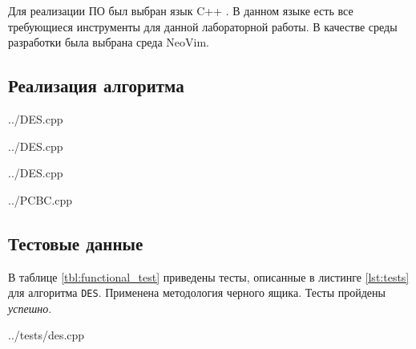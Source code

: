 Для реализации ПО был выбран язык C++ \cite{c++}.
В данном языке есть все требующиеся инструменты для данной лабораторной работы.
В качестве среды разработки была выбрана среда NeoVim\cite{nvim}.

\subsection{Реализация алгоритма}

\begin{lstinputlisting}[
        caption={\raggedright Реализация алгоритма DES.},
        label={lst:des},
        language={C++},
        linerange={3-32}
    ]{../DES.cpp}
\end{lstinputlisting}

\begin{lstinputlisting}[
        caption={\raggedright Реализация алгоритма DES, часть 2.},
        label={lst:des},
        language={C++},
        linerange={33-69}
    ]{../DES.cpp}
\end{lstinputlisting}

\begin{lstinputlisting}[
        caption={\raggedright Реализация алгоритма DES, часть 3.},
        label={lst:des-2},
        language={C++},
        linerange={70-81}
    ]{../DES.cpp}
\end{lstinputlisting}

\begin{lstinputlisting}[
        caption={\raggedright Реализация алгоритма шифрования PCBC.},
        label={lst:pcbc},
        language={C++},
        linerange={25-38,40-50}
    ]{../PCBC.cpp}
\end{lstinputlisting}

\subsection{Тестовые данные}

В таблице \ref{tbl:functional_test} приведены тесты, описанные в листинге \ref{lst:tests} для алгоритма \texttt{DES}. 
Применена методология черного ящика. Тесты пройдены \textit{успешно}.
%
\begin{lstinputlisting}[
        caption={\raggedright Реализация функциональных тестов.},
        label={lst:tests},
        language={C++},
        linerange={3-16}
    ]{../tests/des.cpp}
\end{lstinputlisting}

